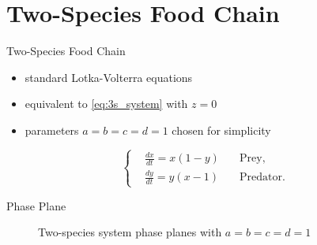 \documentclass[hyperref={colorlinks,allcolors=black}]{beamer}
\begin{document}
\section{Two-Species Food Chain}

\begin{frame}{Two-Species Food Chain}
    \begin{itemize}
\setlength\itemsep{1em}
        \item standard Lotka-Volterra equations
        \item equivalent to \eqref{eq:3s_system} with $z=0$
        \item parameters $a=b=c=d=1$ chosen for simplicity
    \end{itemize}
\begin{equation}
    \left\{\begin{aligned}
        &\frac{dx}{dt} = x(1 - y) \quad &\text{Prey,}\\
        &\frac{dy}{dt} = y(x - 1) \quad &\text{Predator.}
    \end{aligned}\right.
    \label{eq:2s_example}
\end{equation}
\end{frame}

\begin{frame}{Phase Plane}
\begin{figure}[H]%
%
\quad
{}%
\captionsetup{justification=centering}
\caption{Two-species system phase planes with $a=b=c=d=1$}%
\label{fig:2s_phase_plane}%
\end{figure}
\end{frame}
\end{document}
